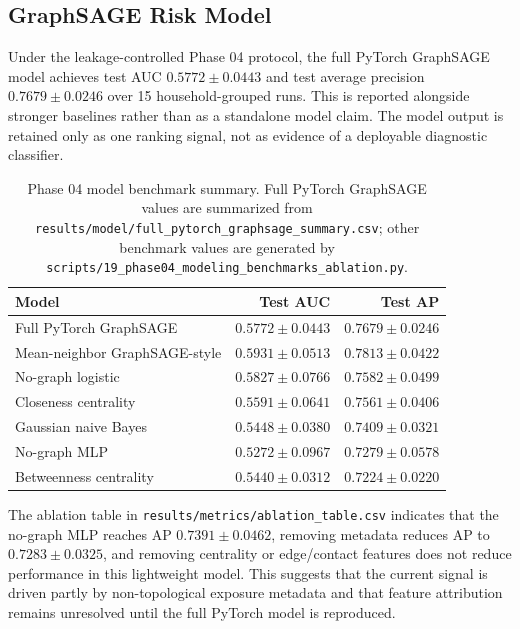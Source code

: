 \documentclass[11pt,a4paper]{article}
\begin{document}
\subsection{GraphSAGE Risk Model}

Under the leakage-controlled Phase 04 protocol, the full PyTorch GraphSAGE model achieves test AUC \(0.5772 \pm 0.0443\) and test average precision \(0.7679 \pm 0.0246\) over 15 household-grouped runs. This is reported alongside stronger baselines rather than as a standalone model claim. The model output is retained only as one ranking signal, not as evidence of a deployable diagnostic classifier.

\begin{table}[htbp]
\centering
\caption{Phase 04 model benchmark summary. Full PyTorch GraphSAGE values are summarized from \texttt{results/model/full\_pytorch\_graphsage\_summary.csv}; other benchmark values are generated by \texttt{scripts/19\_phase04\_modeling\_benchmarks\_ablation.py}.}
\label{tab:gnn-performance}
\begin{tabular}{lrr}
\toprule
Model & Test AUC & Test AP \\
\midrule
Full PyTorch GraphSAGE & \(0.5772 \pm 0.0443\) & \(0.7679 \pm 0.0246\) \\
Mean-neighbor GraphSAGE-style & \(0.5931 \pm 0.0513\) & \(0.7813 \pm 0.0422\) \\
No-graph logistic & \(0.5827 \pm 0.0766\) & \(0.7582 \pm 0.0499\) \\
Closeness centrality & \(0.5591 \pm 0.0641\) & \(0.7561 \pm 0.0406\) \\
Gaussian naive Bayes & \(0.5448 \pm 0.0380\) & \(0.7409 \pm 0.0321\) \\
No-graph MLP & \(0.5272 \pm 0.0967\) & \(0.7279 \pm 0.0578\) \\
Betweenness centrality & \(0.5440 \pm 0.0312\) & \(0.7224 \pm 0.0220\) \\
\bottomrule
\end{tabular}
\end{table}

The ablation table in \texttt{results/metrics/ablation\_table.csv} indicates that the no-graph MLP reaches AP \(0.7391 \pm 0.0462\), removing metadata reduces AP to \(0.7283 \pm 0.0325\), and removing centrality or edge/contact features does not reduce performance in this lightweight model. This suggests that the current signal is driven partly by non-topological exposure metadata and that feature attribution remains unresolved until the full PyTorch model is reproduced.
\end{document}
